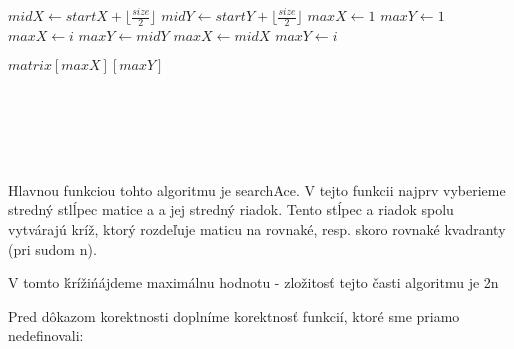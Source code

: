 \documentclass[paper=a4, fontsize=11pt]{scrartcl} %
\numberwithin{equation}{section} %
\numberwithin{figure}{section} %
\numberwithin{table}{section} %
\begin{document}
\newcommand{\pushcode}[1][1]{\hskip\dimexpr#1\algorithmicindent\relax}

\algnewcommand{}
\algnewcommand{}

\begin{algorithmic}[1]
        \State $midX \gets startX + \lfloor \frac{size}{2} \rfloor$
	\State $midY \gets startY + \lfloor \frac{size}{2} \rfloor$
	\State $maxX \gets 1$
	\State $maxY \gets 1$
			\State $maxX \gets i$
			\State $maxY \gets midY$
		\EndIf
	\EndFor
			\State $maxX \gets midX$
			\State $maxY \gets i$
		\EndIf
	\EndFor

	
		\State \Return $matrix[maxX][maxY]$
	\EndIf
		
		\State {}
		\State {}
		\State {}
		\State {}
	\EndIf

	
    \EndFunction
\\
\\
		\State {}
	\EndFunction
\\
\\
         \State {}
    \EndFunction
\end{algorithmic}


Hlavnou funkciou tohto algoritmu je searchAce.
V tejto funkcii najprv vyberieme stredný stlĺpec matice a a jej stredný riadok.
Tento stĺpec a riadok spolu vytvárajú kríž, ktorý rozdeľuje maticu na rovnaké, resp. skoro rovnaké kvadranty (pri sudom n).

V tomto \'kríži\' nájdeme maximálnu hodnotu - zložitosť tejto časti algoritmu je 2n

Pred dôkazom korektnosti doplníme korektnosť funkcií, ktoré sme priamo nedefinovali:
\end{document}
